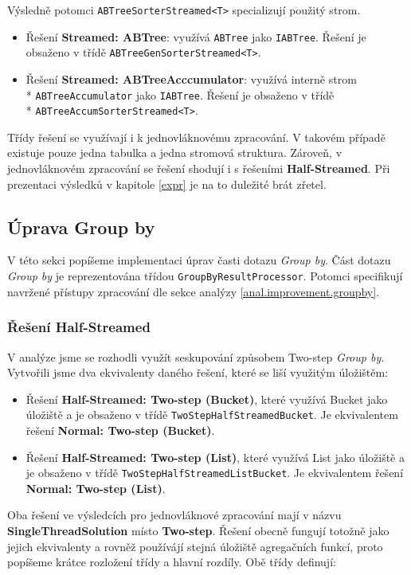 Výsledně potomci \texttt{ABTreeSorterStreamed<T>} specializují použitý strom.
\begin{itemize}
\item Řešení \textbf{Streamed: ABTree}: využívá \texttt{ABTree} jako \texttt{IABTree}.
Řešení je obsaženo v třídě \texttt{ABTreeGenSorterStreamed<T>}.
\item Řešení \textbf{Streamed: ABTreeAcccumulator}: využívá interně strom\\* \texttt{ABTreeAccumulator} jako \texttt{IABTree}.
Řešení je obsaženo v třídě\\* \texttt{ABTreeAccumSorterStreamed<T>}.
\end{itemize}

Třídy řešení se využívají i k jednovláknovému zpracování.
V takovém případě existuje pouze jedna tabulka a jedna stromová struktura.
Zároveň, v jednovláknovém zpracování se řešení shodují i s řešeními \textbf{Half-Streamed}.
Při prezentaci výsledků v kapitole \ref{expr} je na to duležité brát zřetel.

\subsection{Úprava Group by}

V této sekci popíšeme implementaci úprav časti dotazu \textit{Group by}.
Část dotazu \textit{Group by} je reprezentována třídou \texttt{GroupByResultProcessor}.
Potomci specifikují navržené přístupy zpracování dle sekce analýzy \ref{anal.improvement.groupby}.

\subsubsection{Řešení Half-Streamed}

V analýze jsme se rozhodli využít seskupování způsobem Two-step \textit{Group by}.
Vytvořili jsme dva ekvivalenty daného řešení, které se liší využitým úložištěm: 
\begin{itemize}
\item Řešení \textbf{Half-Streamed: Two-step (Bucket)}, které využívá Bucket jako úložiště a je obsaženo v třídě \texttt{TwoStepHalfStreamedBucket}.
Je ekvivalentem řešení \textbf{Normal: Two-step (Bucket)}.
\item Řešení \textbf{Half-Streamed: Two-step (List)}, které využívá List jako úložiště a je obsaženo v třídě \texttt{TwoStepHalfStreamedListBucket}.
Je ekvivalentem řešení \textbf{Normal: Two-step (List)}.
\end{itemize}
Oba řešení ve výsledcích pro jednovláknové zpracování mají v názvu \textbf{SingleThreadSolution} místo \textbf{Two-step}.
Řešení obecně fungují totožně jako jejich ekvivalenty a rovněž používájí stejná úložiště agregačních funkcí, proto popíšeme krátce rozložení třídy a hlavní rozdíly.
Obě třídy definují:

